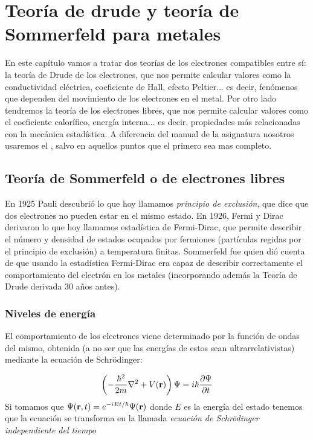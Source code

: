 
\chapter[Teoría de Drude y Sommerfeld]{Teoría de drude y teoría de Sommerfeld para metales} \label{Ch:06}

En este capítulo vamos a tratar dos teorías de los electrones compatibles entre sí: la teoría de Drude de los electrones, que nos permite calcular valores como la conductividad eléctrica, coeficiente de Hall, efecto Peltier... es decir, fenómenos que dependen del movimiento de los electrones en el metal. Por otro lado tendremos la teoría de los electrones libres, que nos permite calcular valores como el coeficiente calorífico, energía interna... es decir, propiedades más relacionadas con la mecánica estadística. A diferencia del manual de la asignatura \cite{Fisica_del_Estado_Solido} nosotros usaremos el \cite{Oxford_Solid_State}, salvo en aquellos puntos que el primero sea mas completo.

\section{Teoría de Sommerfeld o de electrones libres}

En 1925 Pauli descubrió lo que hoy llamamos \textit{principio de exclusión}, que dice que dos electrones no pueden estar en el mismo estado. En 1926, Fermi y Dirac derivaron lo que hoy llamamos estadística de Fermi-Dirac, que permite describir el número y densidad de estados ocupados por fermiones (partículas regidas por el principio de exclusión) a temperatura finitas. Sommerfeld fue quien dió cuenta de que usando la estadística Fermi-Dirac era capaz de describir correctamente el comportamiento del electrón en los metales (incorporando además la Teoría de Drude derivada 30 años antes).

\subsection{Niveles de energía}

El comportamiento de los electrones viene determinado por la función de ondas del mismo, obtenida (a no ser que las energías de estos sean ultrarrelativistas)  mediante la ecuación de Schrödinger:

\begin{equation}
	\left( -\frac{\hbar^2}{2m} \nabla^2 + V(\mathbf{r}) \right) \Psi = i \hbar \frac{\partial \Psi}{\partial t}
\end{equation}
Si tomamos que $\Psi (\mathbf{r},t)=e^{-iEt/\hbar} \Psi (\mathbf{r})$ donde $E$ es la energía del estado tenemos que la ecuación se transforma en la llamada \textit{ecuación de Schrödinger independiente del tiempo}


